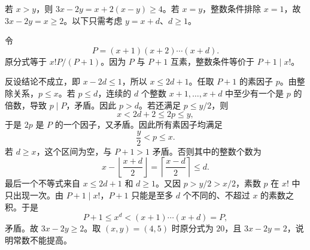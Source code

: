 若 $x>y$，则 $3x-2y=x+2(x-y)\ge4$。若 $x=y$，整数条件排除 $x=1$，故 $3x-2y=x\ge2$。以下只需考虑 $y=x+d$、$d\ge1$。

令
\[
 P=(x+1)(x+2)\cdots(x+d).
\]
原分式等于 $x!P/(P+1)$。因为 $P$ 与 $P+1$ 互素，整数条件等价于 $P+1\mid x!$。

反设结论不成立，即 $x-2d\le1$，所以 $x\le2d+1$。任取 $P+1$ 的素因子 $p$。由整除关系，$p\le x$。若 $p\le d$，连续的 $d$ 个整数 $x+1,\ldots,x+d$ 中至少有一个是 $p$ 的倍数，导致 $p\mid P$，矛盾。因此 $p>d$。若还满足 $p\le y/2$，则
\[
 x<2d+2\le2p\le y,
\]
于是 $2p$ 是 $P$ 的一个因子，又矛盾。因此所有素因子均满足
\[
 \frac y2<p\le x.
\]
若 $d\ge x$，这个区间为空，与 $P+1>1$ 矛盾。否则其中的整数个数为
\[
 x-\left\lfloor\frac{x+d}{2}\right\rfloor
 =\left\lceil\frac{x-d}{2}\right\rceil\le d.
\]
最后一个不等式来自 $x\le2d+1$ 和 $d\ge1$。又因 $p>y/2>x/2$，素数 $p$ 在 $x!$ 中只出现一次。由 $P+1\mid x!$，$P+1$ 只能是至多 $d$ 个不同的、不超过 $x$ 的素数之积。于是
\[
 P+1\le x^d<(x+1)\cdots(x+d)=P,
\]
矛盾。故 $3x-2y\ge2$。取 $(x,y)=(4,5)$ 时原分式为 $20$，且 $3x-2y=2$，说明常数不能提高。
